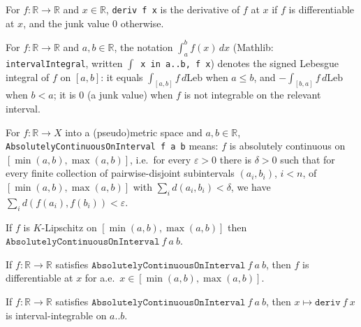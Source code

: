 \begin{definition}
  For $f : \mathbb{R} \to \mathbb{R}$ and $x \in \mathbb{R}$, \texttt{deriv f x} is the derivative
  of $f$ at $x$ if $f$ is differentiable at $x$, and the junk value $0$ otherwise.
\end{definition}

\begin{definition}
  For $f : \mathbb{R} \to \mathbb{R}$ and $a, b \in \mathbb{R}$, the notation
  $\int_a^b f(x)\,dx$ (Mathlib: \texttt{intervalIntegral}, written \texttt{$\int$ x in a..b, f x})
  denotes the signed Lebesgue integral of $f$ on $[a,b]$: it equals
  $\int_{[a,b]} f\,d\mathrm{Leb}$ when $a \le b$, and $-\int_{[b,a]} f\,d\mathrm{Leb}$ when $b < a$;
  it is $0$ (a junk value) when $f$ is not integrable on the relevant interval.
\end{definition}

\begin{definition}
  For $f : \mathbb{R} \to X$ into a (pseudo)metric space and $a,b \in \mathbb{R}$,
  \texttt{AbsolutelyContinuousOnInterval f a b} means: $f$ is absolutely continuous on
  $[\min(a,b),\max(a,b)]$, i.e.\ for every $\varepsilon>0$ there is $\delta>0$ such that for every
  finite collection of pairwise-disjoint subintervals $(a_i,b_i)$, $i<n$, of $[\min(a,b),\max(a,b)]$
  with $\sum_i d(a_i,b_i) < \delta$, we have $\sum_i d(f(a_i),f(b_i)) < \varepsilon$.
\end{definition}

\begin{proposition}
  If $f$ is $K$-Lipschitz on $[\min(a,b),\max(a,b)]$ then
  $\texttt{AbsolutelyContinuousOnInterval}\ f\ a\ b$.
\end{proposition}

\begin{proposition}
  If $f : \mathbb{R} \to \mathbb{R}$ satisfies $\texttt{AbsolutelyContinuousOnInterval}\ f\ a\ b$,
  then $f$ is differentiable at $x$ for a.e.\ $x \in [\min(a,b),\max(a,b)]$.
\end{proposition}

\begin{proposition}
  If $f : \mathbb{R} \to \mathbb{R}$ satisfies $\texttt{AbsolutelyContinuousOnInterval}\ f\ a\ b$,
  then $x \mapsto \texttt{deriv}\ f\ x$ is interval-integrable on $a..b$.
\end{proposition}

